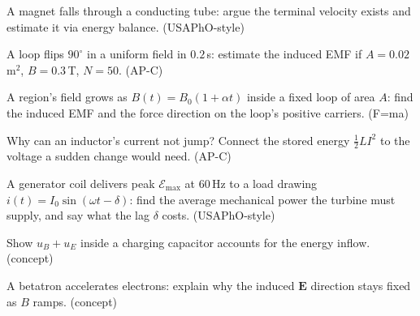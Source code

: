 \begin{exercise}[hard]
A magnet falls through a conducting tube: argue the terminal velocity
exists and estimate it via energy balance. (USAPhO-style)
\end{exercise}
\begin{exercise}[easy]
A loop flips $90^{\circ}$ in a uniform field in $0.2$\,s: estimate the
induced EMF if $A=0.02$\,m$^{2}$, $B=0.3$\,T, $N=50$. (AP-C)
\end{exercise}
\begin{exercise}[medium]
A region's field grows as $B(t)=B_0(1+\alpha t)$ inside a fixed loop
of area $A$: find the induced EMF and the force direction on the
loop's positive carriers. (F=ma)
\end{exercise}
\begin{exercise}[medium]
Why can an inductor's current not jump? Connect the stored energy
$\tfrac12LI^{2}$ to the voltage a sudden change would need. (AP-C)
\end{exercise}
\begin{exercise}[hard]
A generator coil delivers peak $\mathcal E_{\max}$ at $60$\,Hz to a
load drawing $i(t)=I_0\sin(\omega t-\delta)$: find the average
mechanical power the turbine must supply, and say what the lag
$\delta$ costs. (USAPhO-style)
\end{exercise}
\begin{exercise}[medium]
Show $u_B+u_E$ inside a charging capacitor accounts for the energy
inflow. (concept)
\end{exercise}
\begin{exercise}[medium]
A betatron accelerates electrons: explain why the induced $\mathbf E$
direction stays fixed as $B$ ramps. (concept)
\end{exercise}
